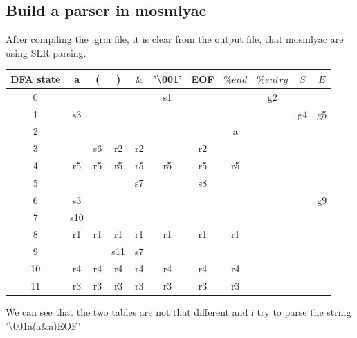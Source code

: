 \documentclass[11pt,a4paper]{article}
\begin{document}
\subsection{Build a parser in mosmlyac}
After compiling the .grm file, it is clear from the output file, that mosmlyac are using SLR parsing.
\begin{center}
    \begin{tabular}{c|ccccccc|ccc}
        DFA state    & a   & (     & )     & $\&$  & '\textbackslash001'   & EOF   & $\%end$   & $\%entry$  & $S$   & $E$ \\ \hline
         0           &     &       &       &       & s1    &       &           & g2         &       & \\      
         1           & s3  &       &       &       &       &       &           &            & g4    & g5 \\      
         2           &     &       &       &       &       &       & a         &            &       & \\      
         3           &     & s6    & r2    & r2    &       & r2    &           &            &       & \\      
         4           & r5  & r5    & r5    & r5    & r5    & r5    & r5        &            &       & \\      
         5           &     &       &       & s7    &       & s8    &           &            &       & \\      
         6           & s3  &       &       &       &       &       &           &            &       & g9\\      
         7           & s10 &       &       &       &       &       &           &            &       & \\      
         8           & r1  & r1    & r1    & r1    & r1    & r1    & r1        &            &       & \\      
         9           &     &       & s11   & s7    &       &       &           &            &       & \\      
        10           & r4  & r4    & r4    & r4    & r4    & r4    & r4        &            &       & \\      
        11           & r3  & r3    & r3    & r3    & r3    & r3    & r3        &            &       & \\      
    \end{tabular}
\end{center}
We can see that the two tables are not that different and i try to parse the string '\textbackslash001a(a\&a)EOF'
\end{document}
